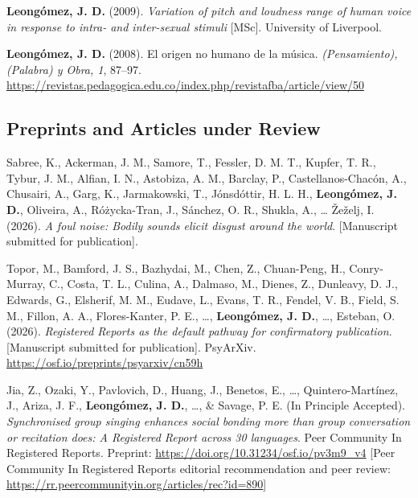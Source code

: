 \documentclass[11pt,a4paper,]{awesome-cv}
\begin{document}
\textcolor{teal}{\faStar} \textbf{Leongómez, J. D.} (2009).
\emph{Variation of pitch and loudness range of human voice in response
to intra- and inter-sexual stimuli} {[}MSc{]}. University of Liverpool.

\textcolor{teal}{\faStar} \textbf{Leongómez, J. D.} (2008). El origen no
humano de la música. \emph{(Pensamiento), (Palabra) y Obra, 1}, 87--97.
\url{https://revistas.pedagogica.edu.co/index.php/revistafba/article/view/50}

\endgroup

\subsection{\texorpdfstring{\textbf{Preprints and Articles under Review}}{}}\label{section-2}

\begingroup
  \footnotesize
  \setlength{\parindent}{-0.5in}
  \setlength{\leftskip}{0.5in}

Sabree, K., Ackerman, J. M., Samore, T., Fessler, D. M. T., Kupfer, T.
R., Tybur, J. M., Alfian, I. N., Astobiza, A. M., Barclay, P.,
Castellanos-Chacón, A., Chusairi, A., Garg, K., Jarmakowski, T.,
Jónsdóttir, H. L. H., \textbf{Leongómez, J. D.}, Oliveira, A.,
Różycka-Tran, J., Sánchez, O. R., Shukla, A., \ldots{} Žeželj, I.
(2026). \emph{A foul noise: Bodily sounds elicit disgust around the
world}. {[}Manuscript submitted for publication{]}.

Topor, M., Bamford, J. S., Bazhydai, M., Chen, Z., Chuan-Peng, H.,
Conry-Murray, C., Costa, T. L., Culina, A., Dalmaso, M., Dienes, Z.,
Dunleavy, D. J., Edwards, G., Elsherif, M. M., Eudave, L., Evans, T. R.,
Fendel, V. B., Field, S. M., Fillon, A. A., Flores-Kanter, P. E.,
\ldots, \textbf{Leongómez, J. D.}, \ldots, Esteban, O. (2026).
\emph{Registered Reports as the default pathway for confirmatory
publication}. {[}Manuscript submitted for publication{]}. PsyArXiv.
\url{https://osf.io/preprints/psyarxiv/cn59h}

Jia, Z., Ozaki, Y., Pavlovich, D., Huang, J., Benetos, E., \ldots,
Quintero-Martínez, J., Ariza, J. F., \textbf{Leongómez, J. D.}, \ldots,
\& Savage, P. E. (In Principle Accepted). \emph{Synchronised group
singing enhances social bonding more than group conversation or
recitation does: A Registered Report across 30 languages}. Peer
Community In Registered Reports. Preprint:
\url{https://doi.org/10.31234/osf.io/pv3m9_v4} {[}Peer Community In
Registered Reports editorial recommendation and peer review:
\url{https://rr.peercommunityin.org/articles/rec?id=890}{]}
\end{document}
